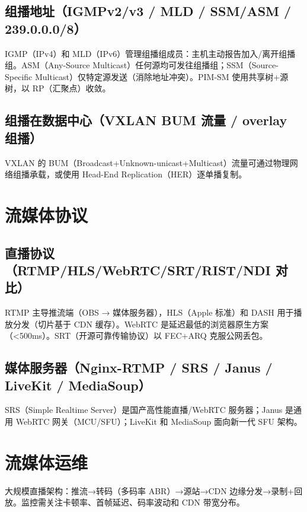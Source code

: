 \documentclass[12pt,UTF8]{ctexbook}
\begin{document}
    \subsection{组播地址（IGMPv2/v3 / MLD / SSM/ASM / 239.0.0.0/8）}

IGMP（IPv4）和 MLD（IPv6）管理组播组成员：主机主动报告加入/离开组播组。ASM（Any-Source Multicast）任何源均可发往组播组；SSM（Source-Specific Multicast）仅特定源发送（消除地址冲突）。PIM-SM 使用共享树+源树，以 RP（汇聚点）收敛。

    \subsection{组播在数据中心（VXLAN BUM 流量 / overlay 组播）}

VXLAN 的 BUM（Broadcast+Unknown-unicast+Multicast）流量可通过物理网络组播承载，或使用 Head-End Replication（HER）逐单播复制。

  \section{流媒体协议}
    \subsection{直播协议（RTMP/HLS/WebRTC/SRT/RIST/NDI 对比）}

RTMP 主导推流端（OBS → 媒体服务器），HLS（Apple 标准）和 DASH 用于播放分发（切片基于 CDN 缓存）。WebRTC 是延迟最低的浏览器原生方案（<500ms）。SRT（开源可靠传输协议）以 FEC+ARQ 克服公网丢包。

    \subsection{媒体服务器（Nginx-RTMP / SRS / Janus / LiveKit / MediaSoup）}

SRS（Simple Realtime Server）是国产高性能直播/WebRTC 服务器；Janus 是通用 WebRTC 网关（MCU/SFU）；LiveKit 和 MediaSoup 面向新一代 SFU 架构。

  \section{流媒体运维}

大规模直播架构：推流→转码（多码率 ABR）→源站→CDN 边缘分发→录制+回放。监控需关注卡顿率、首帧延迟、码率波动和 CDN 带宽分布。


\end{document}
